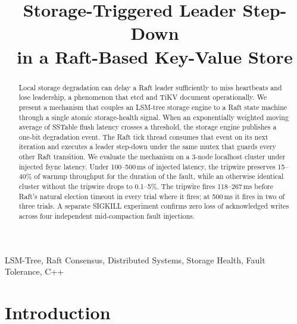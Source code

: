 \documentclass[conference, a4paper]{IEEEtran}
\begin{document}
\title{Storage-Triggered Leader Step-Down\\ in a Raft-Based Key-Value Store}

\author{
\and
{}
}

\maketitle

\begin{abstract}
Local storage degradation can delay a Raft leader sufficiently to miss
heartbeats and lose leadership, a phenomenon that etcd and TiKV document
operationally. We present a mechanism that couples an LSM-tree storage
engine to a Raft state machine through a single atomic storage-health
signal. When an exponentially weighted moving average of SSTable flush
latency crosses a threshold, the storage engine publishes a one-bit
degradation event. The Raft tick thread consumes that event on its next
iteration and executes a leader step-down under the same mutex that
guards every other Raft transition. We evaluate the mechanism on a
3-node localhost cluster under injected fsync latency. Under 100--500\,ms
of injected latency, the tripwire preserves 15--40\% of warmup
throughput for the duration of the fault, while an otherwise identical
cluster without the tripwire drops to 0.1--5\%. The tripwire fires
118--267\,ms before Raft's natural election timeout in every trial where
it fires; at 500\,ms it fires in two of three trials. A separate SIGKILL
experiment confirms zero loss of acknowledged writes across four
independent mid-compaction fault injections.
\end{abstract}

\begin{IEEEkeywords}
LSM-Tree, Raft Consensus, Distributed Systems, Storage Health, Fault Tolerance, C++
\end{IEEEkeywords}

\section{Introduction}
\end{document}
